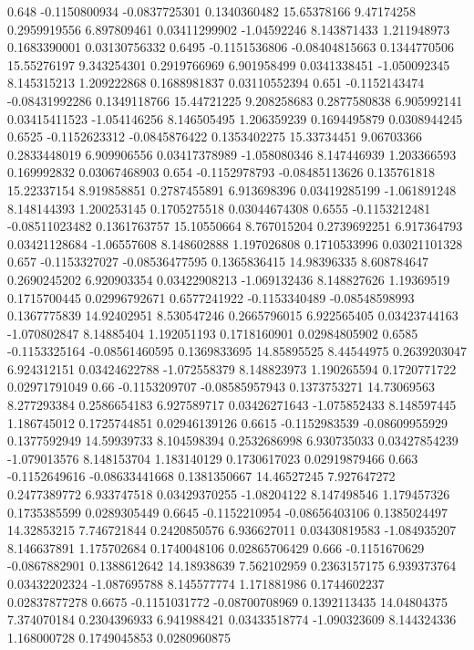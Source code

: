 {0.648 -0.1150800934 -0.0837725301 0.1340360482 15.65378166 9.47174258 0.2959919556 6.897809461 0.03411299902 -1.04592246 8.143871433 1.211948973 0.1683390001 0.03130756332
0.6495 -0.1151536806 -0.08404815663 0.1344770506 15.55276197 9.343254301 0.2919766969 6.901958499 0.0341338451 -1.050092345 8.145315213 1.209222868 0.1688981837 0.03110552394
0.651 -0.1152143474 -0.08431992286 0.1349118766 15.44721225 9.208258683 0.2877580838 6.905992141 0.03415411523 -1.054146256 8.146505495 1.206359239 0.1694495879 0.0308944245
0.6525 -0.1152623312 -0.0845876422 0.1353402275 15.33734451 9.06703366 0.2833448019 6.909906556 0.03417378989 -1.058080346 8.147446939 1.203366593 0.169992832 0.03067468903
0.654 -0.1152978793 -0.08485113626 0.135761818 15.22337154 8.919858851 0.2787455891 6.913698396 0.03419285199 -1.061891248 8.148144393 1.200253145 0.1705275518 0.03044674308
0.6555 -0.1153212481 -0.08511023482 0.1361763757 15.10550664 8.767015204 0.2739692251 6.917364793 0.03421128684 -1.06557608 8.148602888 1.197026808 0.1710533996 0.03021101328
0.657 -0.1153327027 -0.08536477595 0.1365836415 14.98396335 8.608784647 0.2690245202 6.920903354 0.03422908213 -1.069132436 8.148827626 1.19369519 0.1715700445 0.02996792671
0.6577241922 -0.1153340489 -0.08548598993 0.1367775839 14.92402951 8.530547246 0.2665796015 6.922565405 0.03423744163 -1.070802847 8.14885404 1.192051193 0.1718160901 0.02984805902
0.6585 -0.1153325164 -0.08561460595 0.1369833695 14.85895525 8.44544975 0.2639203047 6.924312151 0.03424622788 -1.072558379 8.148823973 1.190265594 0.1720771722 0.02971791049
0.66 -0.1153209707 -0.08585957943 0.1373753271 14.73069563 8.277293384 0.2586654183 6.927589717 0.03426271643 -1.075852433 8.148597445 1.186745012 0.1725744851 0.02946139126
0.6615 -0.1152983539 -0.08609955929 0.1377592949 14.59939733 8.104598394 0.2532686998 6.930735033 0.03427854239 -1.079013576 8.148153704 1.183140129 0.1730617023 0.02919879466
0.663 -0.1152649616 -0.08633441668 0.1381350667 14.46527245 7.927647272 0.2477389772 6.933747518 0.03429370255 -1.08204122 8.147498546 1.179457326 0.1735385599 0.0289305449
0.6645 -0.1152210954 -0.08656403106 0.1385024497 14.32853215 7.746721844 0.2420850576 6.936627011 0.03430819583 -1.084935207 8.146637891 1.175702684 0.1740048106 0.02865706429
0.666 -0.1151670629 -0.0867882901 0.1388612642 14.18938639 7.562102959 0.2363157175 6.939373764 0.03432202324 -1.087695788 8.145577774 1.171881986 0.1744602237 0.02837877278
0.6675 -0.1151031772 -0.08700708969 0.1392113435 14.04804375 7.374070184 0.2304396933 6.941988421 0.03433518774 -1.090323609 8.144324336 1.168000728 0.1749045853 0.0280960875
}
